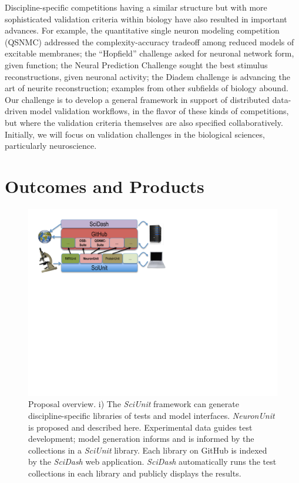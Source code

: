 \documentclass[11pt,letterpaper]{article}
\begin{document}
Discipline-specific competitions having a similar structure but with more sophisticated validation criteria within biology have also resulted in important advances. For example, the quantitative single neuron modeling competition (QSNMC)\cite{jolivet_quantitative_2008} addressed the complexity-accuracy tradeoff among reduced models of excitable membranes; the ``Hopfield'' challenge\cite{hopfield_what_2000} asked for neuronal network form, given function; the Neural Prediction Challenge sought the best stimulus reconstructions, given neuronal activity\cite{neural_prediction_url}; the Diadem challenge is advancing the art of neurite reconstruction\cite{diadem_url}; examples from other subfields of biology abound\cite{dream_url}. Our challenge is to develop a general framework in support of distributed data-driven model validation workflows, in the flavor of these kinds of competitions, but where the validation criteria themselves are also specified collaboratively. Initially, we will focus on validation challenges in the biological sciences, particularly neuroscience. 

\section{Outcomes and Products}
\begin{figure}
\vspace{-45px}
\includegraphics[scale=0.65]{sciunit_overview.pdf}
\caption{Proposal overview. \scriptsize{i) The \textit{SciUnit} framework can generate discipline-specific libraries of tests and model interfaces.  \textit{NeuronUnit} is proposed and described here.  Experimental data guides test development; model generation informs and is informed by the collections in a \textit{SciUnit} library.  Each  library on GitHub is indexed by the \textit{SciDash} web application.  \textit{SciDash} automatically runs the test collections in each library and publicly displays the results.}}
\vspace{-5px}
\label{fig:sciunit_overview}
\end{figure}
\leavevmode
\vspace{-12px}
\end{document}
